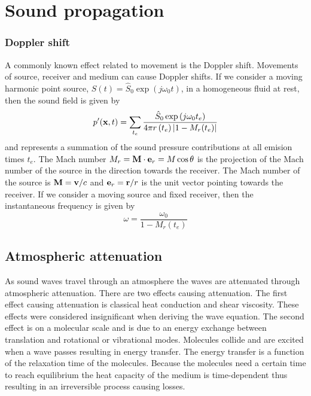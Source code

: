 \section{Sound propagation}

\subsubsection{Doppler shift}
A commonly known effect related to movement is the Doppler shift.
Movements of source, receiver and medium can cause
Doppler shifts. If we consider a moving harmonic point source, $S(t) = \hat{S}_0
\exp{\left(j\omega_0 t\right)} $, in a homogeneous fluid at rest, then the sound
field is given by
\begin{equation}
  p'(\mathbf{x},t) = \sum_{t_e} \frac{\hat{S}_0 \exp{\left(j \omega_0 t_e\right)}}{4\pi r \left(t_e\right) \lvert1-M_r (t_e)\rvert}
\end{equation}
and represents a summation of the sound pressure contributions at all emision
times $t_e$. The Mach number $M_r = \mathbf{M} \cdot \mathbf{e}_r = M \cos{\theta}$ is
the projection of the Mach number of the source in the direction towards the
receiver. The Mach number of the source is $\mathbf{M}=\mathbf{v}/c$ and
$\mathbf{e}_r=\mathbf{r}/r$ is the unit vector pointing towards the receiver.
If we consider a moving source and fixed receiver, then the instantaneous
frequency is given by
\begin{equation}
  \omega = \frac{\omega_0}{1 - M_r(t_e)}
\end{equation}



\subsection{Atmospheric attenuation}\label{sec:theory_sound_atmospheric_attenuation}
As sound waves travel through an atmosphere the waves are attenuated through
atmospheric attenuation. There are two effects causing attenuation. The first
effect causing attenuation is classical heat conduction and shear viscosity.
These effects were considered insignificant when deriving the wave equation. The
second effect is on a molecular scale and is due to an energy exchange between
translation and rotational or vibrational modes. Molecules collide and are
excited when a wave passes resulting in energy transfer. The energy transfer is
a function of the relaxation time of the molecules. Because the molecules need a
certain time to reach equilibrium the heat capacity of the medium is
time-dependent thus resulting in an irreversible process causing losses.

